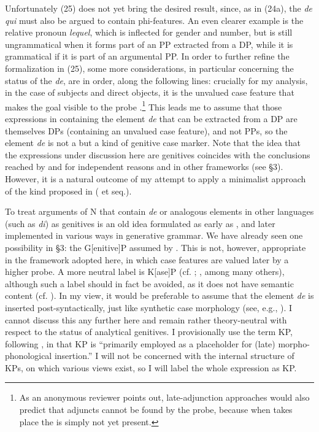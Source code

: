 \documentclass[output=paper]{langsci/langscibook}
\begin{document}
Unfortunately (25) does not yet bring the desired result, since, as in (24a), the  \textit{de qui} must also be argued to contain phi-features. An even clearer example is the relative pronoun \textit{lequel}, which is inflected for gender and number, but is still ungrammatical when it forms part of an  PP extracted from a DP, while it is grammatical if it is part of an argumental PP. In order to further refine the formalization in (25), some more considerations, in particular concerning the status of the  \textit{de}, are in order, along the following lines: crucially for my analysis, in the case of subjects and direct objects, it is the unvalued case feature that makes the goal visible to the probe \citep[123]{Chomsky2000}.\footnote{As an anonymous reviewer points out, late-adjunction approaches would also predict that adjuncts cannot be found by the probe, because when  takes place the  is simply not yet present.} This leads me to assume that those expressions in  containing the element \textit{de} that can be extracted from a DP are themselves DPs (containing an unvalued case feature), and not PPs, so the element \textit{de} is not a  but a kind of genitive case marker. Note that the idea that the expressions under discussion here are genitives coincides with the conclusions reached by \citet{Gutiérrez-Bravo2001} and \citet{Cinque2014} for independent reasons and in other frameworks (see §3). However, it is a natural outcome of my attempt to apply a minimalist approach of the kind proposed in \citeauthor{Chomsky2000} (\citeyear{Chomsky2000} et seq.).

To treat arguments of N that contain \textit{de} or analogous elements in other  languages (such as  \textit{di}) as genitives is an old idea formulated as early as \citet{Benveniste1966}, and later implemented in various ways in generative grammar. We have already seen one possibility in §3: the G[enitive]P assumed by \citet{Cinque2014}. This is not, however, appropriate in the framework adopted here, in which case features are valued later by a higher probe. A more neutral label is K[ase]P (cf. \citealt{Bittner1996}; \citealt{Neeleman1999}, among many others), although such a label should in fact be avoided, as it does not have semantic content (cf. \citealt{Chomsky1995}). In my view, it would be preferable to assume that the element \textit{de} is inserted post-syntactically, just like synthetic case morphology (see, e.g., \citealt{Marchis2018}). I cannot discuss this any further here and remain rather theory-neutral with respect to the status of  analytical genitives. I provisionally use the term KP, following \citet[23]{Biggs2014}, in that KP is “primarily employed as a placeholder for (late) morpho-phonological insertion.” I will not be concerned with the internal structure of KPs, on which various views exist, so I will label the whole expression as KP.
\end{document}

